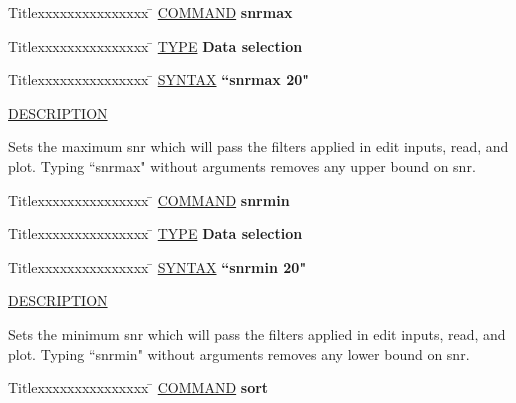 \begin{tabbing}
Titlexxxxxxxxxxxxxxx \= \kill
\underline{COMMAND} \> {\bf 	snrmax} \\
\end{tabbing}

\begin{tabbing}
Titlexxxxxxxxxxxxxxx \= \kill
\underline{TYPE} \> {\bf 		Data selection} \\
\end{tabbing}

\begin{tabbing}
Titlexxxxxxxxxxxxxxx \= \kill
\underline{SYNTAX} \> {\bf 		``snrmax 20"} \\
\end{tabbing}

\underline{DESCRIPTION}
\begin{list}{}{\setlength{\leftmargin}{0.5in}
     \setlength{\rightmargin}{0in}}
\item
Sets the maximum snr which will pass the filters applied
in edit inputs, read, and plot.  Typing ``snrmax" without
arguments removes any upper bound on snr.
\end{list}
\vspace{.2in}

\begin{tabbing}
Titlexxxxxxxxxxxxxxx \= \kill
\underline{COMMAND} \> {\bf 	snrmin} \\
\end{tabbing}

\begin{tabbing}
Titlexxxxxxxxxxxxxxx \= \kill
\underline{TYPE} \> {\bf 		Data selection} \\
\end{tabbing}

\begin{tabbing}
Titlexxxxxxxxxxxxxxx \= \kill
\underline{SYNTAX} \> {\bf 		``snrmin 20"} \\
\end{tabbing}

\underline{DESCRIPTION}
\begin{list}{}{\setlength{\leftmargin}{0.5in}
     \setlength{\rightmargin}{0in}}
\item
Sets the minimum snr which will pass the filters applied
in edit inputs, read, and plot.  Typing ``snrmin" without
arguments removes any lower bound on snr.
\end{list}
\vspace{.2in}

\begin{tabbing}
Titlexxxxxxxxxxxxxxx \= \kill
\underline{COMMAND} \> {\bf 	sort} \\
\end{tabbing}

